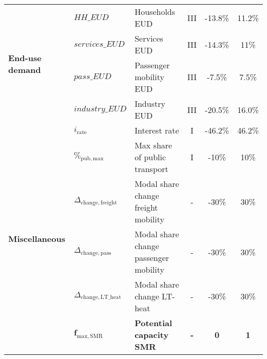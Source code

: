 \begin{table}[htbp!]
\begin{minipage}{\linewidth}
{\begin{tabular}{l l l c c c}
\multirow{4}{*}{\textbf{End-use demand}} &$HH\_EUD$ & Households EUD & III & -13.8\% & 11.2\% \\
& $services\_EUD$ & Services EUD & III & -14.3\% & 11\% \\
& $pass\_EUD$ & Passenger mobility EUD & III & -7.5\% & 7.5\% \\
& $industry\_EUD$ & Industry EUD & III & -20.5\% & 16.0\% \\
\midrule

\multirow{6}{*}{\textbf{Miscellaneous}} &$i_{\mathrm{rate}}$  & Interest rate & I & -46.2\% & 46.2\% \\
& $\%_{\mathrm{pub,max}}$ & Max share of public transport & I & -10\% & 10\% \\
& $\Delta_{\mathrm{change,freight}}$ & Modal share change freight mobility & - & -30\% & 30\% \\
& $\Delta_{\mathrm{change,pass}}$ & Modal share change passenger mobility & - & -30\% & 30\% \\
& $\Delta_{\mathrm{change,LT\_heat}}$ & Modal share change LT-heat & - & -30\% & 30\% \\
& $\bm{f_{\mathrm{max,SMR}}}$ & \textbf{Potential capacity \gls{SMR}} & \textbf{-} & \textbf{0} & \textbf{1} \\

\bottomrule							

\end{tabular}}
\end{minipage}
\end{table}